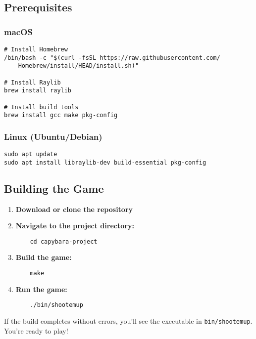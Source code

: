 \documentclass[11pt,a4paper]{article}
\begin{document}
\subsection{Prerequisites}

\subsubsection{macOS}
\begin{verbatim}
# Install Homebrew
/bin/bash -c "$(curl -fsSL https://raw.githubusercontent.com/
    Homebrew/install/HEAD/install.sh)"

# Install Raylib
brew install raylib

# Install build tools
brew install gcc make pkg-config
\end{verbatim}

\subsubsection{Linux (Ubuntu/Debian)}
\begin{verbatim}
sudo apt update
sudo apt install libraylib-dev build-essential pkg-config
\end{verbatim}

\subsection{Building the Game}

\begin{enumerate}[leftmargin=*]
    \item \textbf{Download or clone the repository}
    \item \textbf{Navigate to the project directory:}
    \begin{verbatim}
    cd capybara-project
    \end{verbatim}
    \item \textbf{Build the game:}
    \begin{verbatim}
    make
    \end{verbatim}
    \item \textbf{Run the game:}
    \begin{verbatim}
    ./bin/shootemup
    \end{verbatim}
\end{enumerate}

\begin{tcolorbox}[colback=successcolor!10, colframe=successcolor, title=\faCheck~Success!]
If the build completes without errors, you'll see the executable in \texttt{bin/shootemup}. You're ready to play!
\end{tcolorbox}
\end{document}
